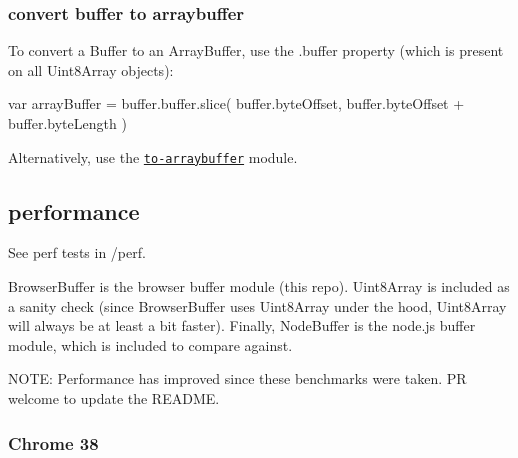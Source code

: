 \subsubsection*{convert buffer to arraybuffer}

To convert a {\ttfamily Buffer} to an {\ttfamily Array\+Buffer}, use the {\ttfamily .buffer} property (which is present on all {\ttfamily Uint8\+Array} objects)\+:


\begin{DoxyCode}
var arrayBuffer = buffer.buffer.slice(
  buffer.byteOffset, buffer.byteOffset + buffer.byteLength
)
\end{DoxyCode}


Alternatively, use the \href{https://www.npmjs.com/package/to-arraybuffer}{\tt {\ttfamily to-\/arraybuffer}} module.

\subsection*{performance}

See perf tests in {\ttfamily /perf}.

{\ttfamily Browser\+Buffer} is the browser {\ttfamily buffer} module (this repo). {\ttfamily Uint8\+Array} is included as a sanity check (since {\ttfamily Browser\+Buffer} uses {\ttfamily Uint8\+Array} under the hood, {\ttfamily Uint8\+Array} will always be at least a bit faster). Finally, {\ttfamily Node\+Buffer} is the node.\+js buffer module, which is included to compare against.

N\+O\+TE\+: Performance has improved since these benchmarks were taken. PR welcome to update the R\+E\+A\+D\+ME.

\subsubsection*{Chrome 38}

